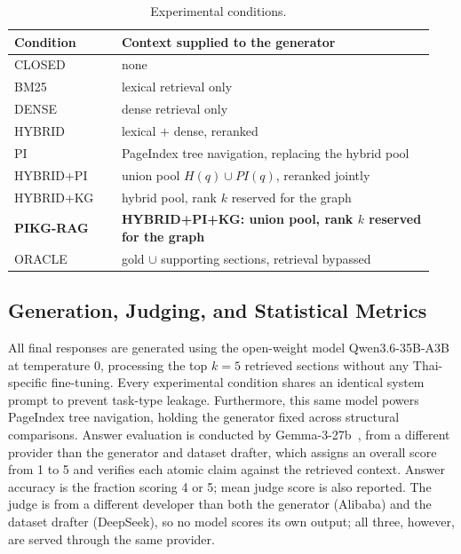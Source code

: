 \documentclass[conference]{IEEEtran}
\begin{document}
\begin{table}[t]
\caption{Experimental conditions.}
\label{tab:conditions}
\centering
\footnotesize
\setlength{\tabcolsep}{4pt}
\begin{tabular}{@{}p{0.24\linewidth}p{0.70\linewidth}@{}}
\hline
\textbf{Condition} & \textbf{Context supplied to the generator} \\
\hline
CLOSED & none \\
BM25 & lexical retrieval only \\
DENSE & dense retrieval only \\
HYBRID & lexical $+$ dense, reranked \\
PI & PageIndex tree navigation, replacing the hybrid pool \\
HYBRID+PI & union pool $H(q)\cup P\!I(q)$, reranked jointly \\
HYBRID+KG & hybrid pool, rank $k$ reserved for the graph \\
\textbf{PIKG-RAG} & \textbf{HYBRID+PI+KG: union pool, rank $k$ reserved for the graph} \\
ORACLE & gold $\cup$ supporting sections, retrieval bypassed \\
\hline
\end{tabular}
\end{table}

\subsection{Generation, Judging, and Statistical Metrics}

All final responses are generated using the open-weight model
Qwen3.6-35B-A3B~\cite{qwen36model} at temperature $0$, processing the top $k=5$ retrieved sections
without any Thai-specific fine-tuning. Every experimental condition shares an identical system
prompt to prevent task-type leakage. Furthermore, this same model powers PageIndex tree navigation,
holding the generator fixed across structural comparisons. Answer evaluation is conducted by
Gemma-3-27b~\cite{gemma3report}, from a different provider than the generator and dataset drafter,
which assigns an overall score from 1 to 5 and verifies each atomic claim against the retrieved
context. Answer accuracy is the fraction scoring 4 or 5; mean judge score is also reported. The judge
is from a different developer than both the generator (Alibaba) and the dataset drafter (DeepSeek),
so no model scores its own output; all three, however, are served through the same provider.
\end{document}
